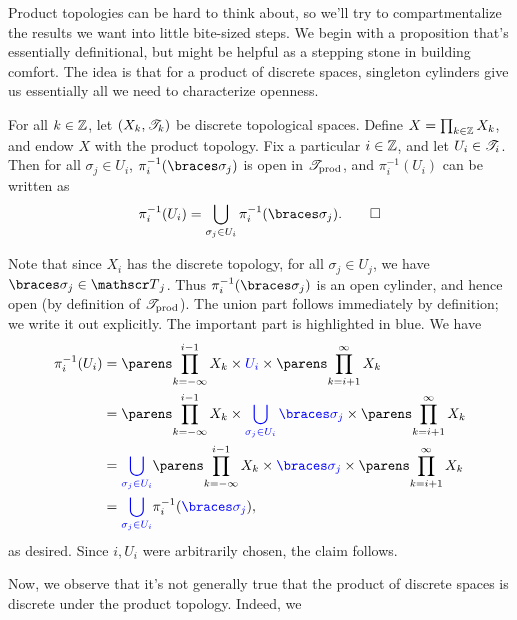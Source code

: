 \documentclass{fkpaper}
\begin{document}
\begin{multicols}{2}
  Product topologies can be hard to think about, so we'll try to
  compartmentalize the results we want into little bite-sized steps. We
  begin with a proposition that's essentially definitional, but might be
  helpful as a stepping stone in building comfort. The idea is that for
  a product of discrete spaces, singleton cylinders give us essentially
  all we need to characterize openness.
  \begin{proposition}\label{prop:singleton-cylinder}
    For all $k \in \mathbb{Z}$, let $(X_k, {\mathscr{T}}_k)$ be discrete topological
    spaces. Define $X = \prod_{k\in\mathbb{Z}} X_k$, and endow $X$ with the
    product topology. Fix a particular $i \in \mathbb{Z}$, and let $U_i \in{\mathscr{T}}_i$. Then for all $\sigma_j \in U_i$, $\pi_i^{-1}(\set{\sigma_j})$
    is open in ${\mathscr{T}}_{\rm prod}$, and $\pi_i^{-1}(U_i)$ can be written
    as
    \[
      \pi_i^{-1}(U_i) = \bigcup_{\sigma_j \in U_i}
      \pi_i^{-1}(\set{\sigma_j}). \qedhere
    \]
  \end{proposition}
  \begin{sproof}
    Note that since $X_i$ has the discrete topology, for all $\sigma_j
    \in U_j$, we have $\set{\sigma_j} \in \ms T_j$. Thus
    $\pi_i^{-1}(\set{\sigma_j})$ is an open cylinder, and hence open
    (by definition of ${\mathscr{T}}_{\rm prod}$). The union part follows
    immediately by definition; we write it out explicitly. The
    important part is highlighted in {\color{blue} blue}. We have
    \begin{align*}
      \pi_i^{-1}(U_i)
      &= \pn{\prod_{k = -\infty}^{i-1} X_k} \times {\color{blue} U_i}
        \times \pn{\prod_{k=i+1}^\infty X_k} \\
      &= \pn{\prod_{k = -\infty}^{i-1} X_k} \times {\color{blue}
        \bigcup_{\sigma_j \in U_i} \set{\sigma_j}} \times
        \pn{\prod_{k=i+1}^\infty X_k} \\
      &= {\color{blue} \bigcup_{\sigma_j \in U_i}} \pn{\prod_{k =
        -\infty}^{i-1} X_k} \times {\color{blue} \set{\sigma_j}} \times
        \pn{\prod_{k=i+1}^\infty X_k} \\
      &= {\color{blue} \bigcup_{\sigma_j \in U_i}}
        \pi_i^{-1}({\color{blue} \set{\sigma_j}}),
    \end{align*}
    as desired. Since $i, U_i$ were arbitrarily chosen, the claim
    follows. \qedhere
  \end{sproof}
  Now, we observe that it's not generally true that the product of
  discrete spaces is discrete under the product topology. Indeed, we

\end{multicols}
\end{document}
